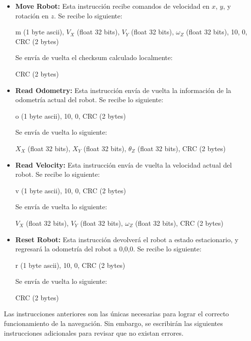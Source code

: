 \begin{itemize}
\item \textbf{Move Robot:} Esta instrucción recibe comandos de velocidad en $x$, $y$, y rotación en $z$. Se recibe lo siguiente:

m (1 byte ascii), $V_X$ (float 32 bits), $V_Y$ (float 32 bits), $\omega_Z$ (float 32 bits), 10, 0, CRC (2 bytes)

Se envía de vuelta el checksum calculado localmente:

CRC (2 bytes)

\item \textbf{Read Odometry:} Esta instrucción envía de vuelta la información de la odometría actual del robot. Se recibe lo siguiente:

o (1 byte ascii), 10, 0, CRC (2 bytes)

Se envía de vuelta lo siguiente:

$X_X$ (float 32 bits), $X_Y$ (float 32 bits), $\theta_Z$ (float 32 bits), CRC (2 bytes)

\item \textbf{Read Velocity:} Esta instrucción envía de vuelta la velocidad actual del robot. Se recibe lo siguiente:

v (1 byte ascii), 10, 0, CRC (2 bytes)

Se envía de vuelta lo siguiente:

$V_X$ (float 32 bits), $V_Y$ (float 32 bits), $\omega_Z$ (float 32 bits), CRC (2 bytes)

\item \textbf{Reset Robot:} Esta instrucción devolverá el robot a estado estacionario, y regresará la odometría del robot a 0,0,0. Se recibe lo siguiente:

r (1 byte ascii), 10, 0, CRC (2 bytes)

Se envía de vuelta lo siguiente:

CRC (2 bytes)
\end{itemize}


Las instrucciones anteriores son las únicas necesarias para lograr el correcto funcionamiento de la navegación. Sin embargo, se escribirán las siguientes instrucciones adicionales para revisar que no existan errores.

